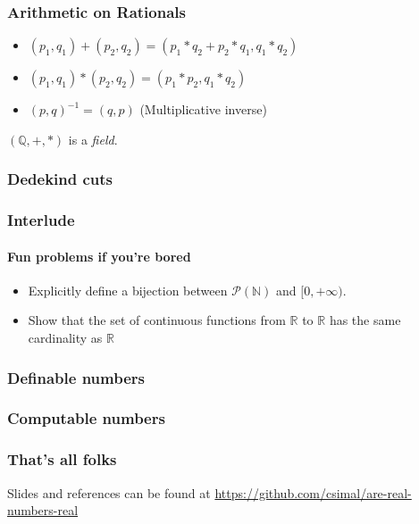 \documentclass{beamer}
\def\N{\mathbb{N}}
\def\R{\mathbb{R}}
\def\Q{\mathbb{Q}}
\begin{document}
\begin{frame}
    \frametitle{Arithmetic on Rationals}
    \begin{itemize}
        \item $(p_1,q_1) + (p_2,q_2) = (p_1*q_2 + p_2*q_1, q_1*q_2)$
        \item $(p_1,q_1) * (p_2,q_2) = (p_1*p_2,q_1*q_2)$
        \item $(p,q)^{-1} = (q,p)$ (Multiplicative inverse)
    \end{itemize}

    \pause[2]
    \vspace{2.5em}
    $(\Q, +, *)$ is a \textit{field}.
\end{frame}

\begin{frame}
    \frametitle{Dedekind cuts}
\end{frame}

\begin{frame}
    \frametitle{Interlude}
    \framesubtitle{Fun problems if you're bored}
    \begin{itemize}
        \item Explicitly define a bijection between $\mathcal{P}(\N)$ and $[0,+\infty)$.
        \item Show that the set of continuous functions from $\R$ to $\R$ has the same cardinality as $\R$
    \end{itemize}
\end{frame}

\begin{frame}
    \frametitle{Definable numbers}
\end{frame}

\begin{frame}
    \frametitle{Computable numbers}
\end{frame}

\begin{frame}
    \frametitle{}
\end{frame}

\begin{frame}
    \frametitle{That's all folks}
    Slides and references can be found at
    \url{https://github.com/csimal/are-real-numbers-real}
\end{frame}
\end{document}

